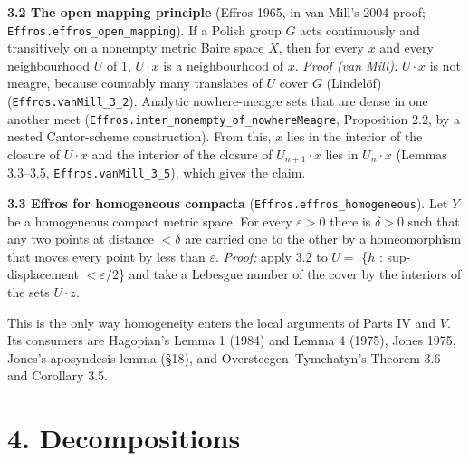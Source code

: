\documentclass[11pt]{article}
\newcommand{\lean}[1]{\texttt{#1}}
\begin{document}
\textbf{3.2 The open mapping principle} (Effros 1965, in van Mill's 2004 proof; \lean{Effros.\hspace{0pt}effros\_\hspace{0pt}open\_\hspace{0pt}mapping}). If a Polish group $G$ acts continuously and transitively on a nonempty metric Baire space $X$, then for every $x$ and every neighbourhood $U$ of 1, $U\cdot x$ is a neighbourhood of $x$. \emph{Proof (van Mill):} $U\cdot x$ is not meagre, because countably many translates of $U$ cover $G$ (Lindel\"of) (\lean{Effros.\hspace{0pt}vanMill\_\hspace{0pt}3\_\hspace{0pt}2}). Analytic nowhere-meagre sets that are dense in one another meet (\lean{Effros.\hspace{0pt}inter\_\hspace{0pt}nonempty\_\hspace{0pt}of\_\hspace{0pt}nowhereMeagre}, Proposition 2.2, by a nested Cantor-scheme construction). From this, $x$ lies in the interior of the closure of $U\cdot x$ and the interior of the closure of $U_{n+1}\cdot x$ lies in $U_n\cdot x$ (Lemmas 3.3--3.5, \lean{Effros.\hspace{0pt}vanMill\_\hspace{0pt}3\_\hspace{0pt}5}), which gives the claim.

\textbf{3.3 Effros for homogeneous compacta} (\lean{Effros.\hspace{0pt}effros\_\hspace{0pt}homogeneous}). Let $Y$ be a homogeneous compact metric space. For every $\varepsilon > 0$ there is $\delta > 0$ such that any two points at distance $< \delta$ are carried one to the other by a homeomorphism that moves every point by less than $\varepsilon$. \emph{Proof:} apply 3.2 to $U =$ \{$h$ : sup-displacement $< \varepsilon /2$\} and take a Lebesgue number of the cover by the interiors of the sets $U\cdot z$.

This is the only way homogeneity enters the local arguments of Parts IV and $V$. Its consumers are Hagopian's Lemma 1 (1984) and Lemma 4 (1975), Jones 1975, Jones's aposyndesis lemma (\S{}18), and Oversteegen--Tymchatyn's Theorem 3.6 and Corollary 3.5.

\section*{4. Decompositions}
\end{document}
